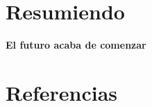 \documentclass[17pt,aspectratio=169,hyperref={pdfusetitle,colorlinks,allcolors=olive}]{beamer}
\begin{document}











\section{Resumiendo}

\begin{frame}[fragile]

{\Large \bf
El futuro acaba de comenzar
}
\end{frame}

\section*{Referencias}
\end{document}
